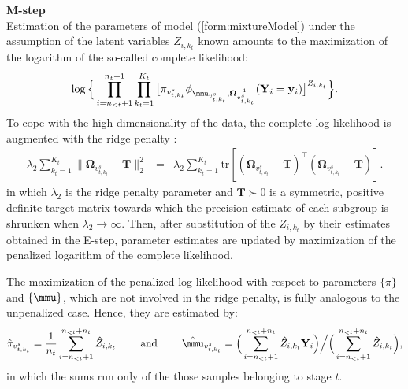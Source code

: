\documentclass[10pt]{article}
\begin{document}
\\
\\
\textbf{M-step}
\\
Estimation of the parameters of model (\ref{form:mixtureModel}) under the assumption of the latent variables $Z_{i, k_t}$ known amounts to the maximization of the logarithm of the so-called complete likelihood:
\begin{eqnarray*}
\log \Big\{
\prod_{i=n_{<t}+1}^{n_t + 1} \prod_{k_t = 1}^{K_t} \big[ \pi_{v_{t, k_t}^s} \phi_{\mmu_{v_{t, k_t}^s}, \mathbf{\Omega}_{v_{t, k_t}^s}^{-1}} ( \mathbf{Y}_i = \mathbf{y}_i ) \big]^{Z_{i, k_t}} \Big\}.
\end{eqnarray*}
To cope with the high-dimensionality of the data, the complete log-likelihood is augmented with the ridge penalty \citep{VWie2014b}:
\begin{eqnarray*}
\lambda_2 \sum_{k_t=1}^{K_t}  \| \mathbf{\Omega}_{v^s_{t, k_t}} - \mathbf{T} \|_2^2 & = &  \lambda_2 \sum_{k_t=1}^{K_t} \mbox{tr} [ (\mathbf{\Omega}_{v_{t, k_t}^s} - \mathbf{T})^{\top} (\mathbf{\Omega}_{v_{t, k_t}^s} - \mathbf{T})].
\end{eqnarray*}
in which $\lambda_2$ is the ridge penalty parameter and $\mathbf{T} \succ 0$ is a symmetric, positive definite target matrix towards which the precision estimate of each subgroup is shrunken when $\lambda_2 \rightarrow \infty$. Then, after substitution of the $Z_{i, k_t}$  by their estimates obtained in the E-step, parameter estimates are updated by maximization of the penalized logarithm of the complete likelihood.

The maximization of the penalized log-likelihood with respect to parameters $\{ \pi \}$ and $\{ \mmu \}$, which are not involved in the ridge penalty, is fully analogous to the unpenalized case. Hence, they are estimated by:
\begin{eqnarray*}
\hat{\pi}_{v_{t, k_t}^s} = \frac{1}{n_t} \sum_{i=n_{<t}+1}^{n_{<t}+n_t} \hat{Z}_{i, k_t}  \qquad \mbox{ and } \qquad \hat{\mmu}_{v_{t, k_t}^s} = \Big( \sum_{i=n_{<t}+1}^{n_{<t}+n_t} \hat{Z}_{i, k_t} \mathbf{Y}_i \Big)  \Big/  \Big( \sum_{i=n_{<t}+1}^{n_{<t}+n_t} \hat{Z}_{i,k_t} \Big),
\end{eqnarray*}
in which the sums run only of the those samples belonging to stage $t$.
\end{document}
